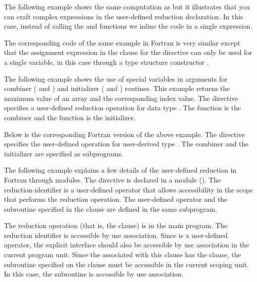 

The following example shows the same computation as  but it illustrates that you can craft complex expressions in the user-defined 
reduction declaration. In this case, instead of calling the  
and  functions we inline the code in a single expression.


The corresponding code of the same example in Fortran is very similar
except that the assignment expression in the  clause for
the 
directive can only be used for a single variable, in this case through
a type structure constructor .



The following example shows the use of special variables in arguments for 
combiner ( and ) and initializer 
( and ) routines.  This example returns 
the maximum value of an array and the corresponding index value. The 
 directive specifies a user-defined 
reduction operation  for data type . 
The function  is the combiner and the function  
is the initializer.


Below is the corresponding Fortran version of the above example.  
The  directive specifies the user-defined 
operation  for user-derived type .  
The combiner  and the initializer  are 
specified as subprograms.



The following example explains a few details of the user-defined reduction 
in Fortran through modules. The  directive 
is declared in a module (). 
The reduction-identifier  is a user-defined operator that
allows accessibility in the scope that performs the reduction
operation.
The user-defined operator  and the subroutine  
specified in the  clause are defined in the same subprogram.

The reduction operation (that is, the  clause) is in the main program.
The reduction identifier  is accessible by use association.
Since  is a user-defined operator, the explicit interface
should also be accessible by use association in the current
program unit.
Since the  associated with this  clause
has the  clause, the subroutine specified on the clause
must be accessible in the current scoping unit.  In this case,
the subroutine  is accessible by use association.

